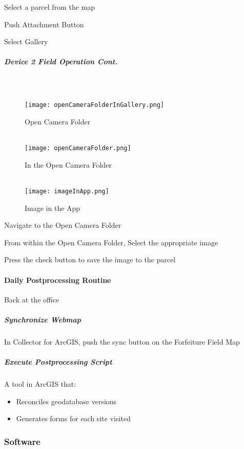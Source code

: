 \documentclass[class=article , crop=false, titlepage, twoside, multi={itemize, figure, verbatim}, float=false]{standalone}
\begin{document}
Select a parcel from the map
\vspace{2in}

\noindent Push Attachment Button
\vspace{2in}

\noindent Select Gallery

\clearpage
\subparagraph*{Device 2 Field Operation Cont.} 
\subparagraph*{\\}

\begin{wrapfigure}{r}{0.5\textwidth}
\centering
\texttt{[image: openCameraFolderInGallery.png]}
\caption {Open Camera Folder}
\vspace{.2in}
\HRule \\[.4cm] %
\vspace{.2in}
\texttt{[image: openCameraFolder.png]}
\caption{In the Open Camera Folder}
\vspace{.2in}
\HRule \\[.4cm] %
\vspace{.2in}
\texttt{[image: imageInApp.png]}
\caption{Image in the App}
\end{wrapfigure}
Navigate to the Open Camera Folder
\vspace{2in}

\noindent From within the Open Camera Folder, Select the appropriate image
\vspace{2in}

\noindent Press the check button to save the image to the parcel 

\clearpage
\paragraph{Daily Postprocessing Routine}Back at the office
\subparagraph{Synchronize Webmap}In Collector for ArcGIS, push the sync button on the Forfeiture Field Map
\subparagraph{Execute Postprocessing Script}A tool in ArcGIS that:

\begin{itemize}
\item Reconciles geodatabase versions
\item Generates forms for each site visited


\end{itemize}

\clearpage
\subsubsection{Software}
\end{document}
